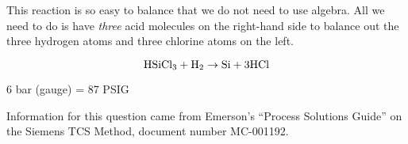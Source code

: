 





This reaction is so easy to balance that we do not need to use algebra.  All we need to do is have {\it three} acid molecules on the right-hand side to balance out the three hydrogen atoms and three chlorine atoms on the left.

$$\hbox{HSiCl}_3 + \hbox{H}_2 \rightarrow \hbox{Si} + 3\hbox{HCl}$$

\vskip 10pt

6 bar (gauge) = 87 PSIG

\vskip 10pt

Information for this question came from Emerson's ``Process Solutions Guide'' on the Siemens TCS Method, document number MC-001192.




